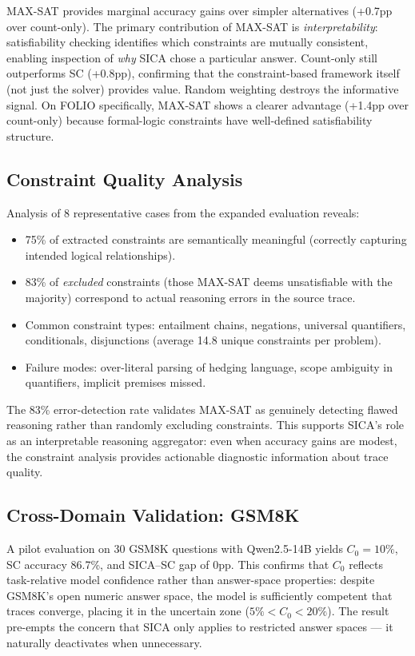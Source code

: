 \documentclass[11pt]{article}
\begin{document}
MAX-SAT provides marginal accuracy gains over simpler alternatives (+0.7pp over count-only). The primary contribution of MAX-SAT is \emph{interpretability}: satisfiability checking identifies which constraints are mutually consistent, enabling inspection of \emph{why} SICA chose a particular answer. Count-only still outperforms SC (+0.8pp), confirming that the constraint-based framework itself (not just the solver) provides value. Random weighting destroys the informative signal. On FOLIO specifically, MAX-SAT shows a clearer advantage (+1.4pp over count-only) because formal-logic constraints have well-defined satisfiability structure.

\subsection{Constraint Quality Analysis}

Analysis of 8 representative cases from the expanded evaluation reveals:
\begin{itemize}
    \item 75\% of extracted constraints are semantically meaningful (correctly capturing intended logical relationships).
    \item 83\% of \emph{excluded} constraints (those MAX-SAT deems unsatisfiable with the majority) correspond to actual reasoning errors in the source trace.
    \item Common constraint types: entailment chains, negations, universal quantifiers, conditionals, disjunctions (average 14.8 unique constraints per problem).
    \item Failure modes: over-literal parsing of hedging language, scope ambiguity in quantifiers, implicit premises missed.
\end{itemize}

The 83\% error-detection rate validates MAX-SAT as genuinely detecting flawed reasoning rather than randomly excluding constraints. This supports SICA's role as an interpretable reasoning aggregator: even when accuracy gains are modest, the constraint analysis provides actionable diagnostic information about trace quality.

\subsection{Cross-Domain Validation: GSM8K}

A pilot evaluation on 30 GSM8K questions with Qwen2.5-14B yields $C_0 = 10\%$, SC accuracy 86.7\%, and SICA--SC gap of 0pp. This confirms that $C_0$ reflects task-relative model confidence rather than answer-space properties: despite GSM8K's open numeric answer space, the model is sufficiently competent that traces converge, placing it in the uncertain zone ($5\% < C_0 < 20\%$). The result pre-empts the concern that SICA only applies to restricted answer spaces --- it naturally deactivates when unnecessary.
\end{document}
